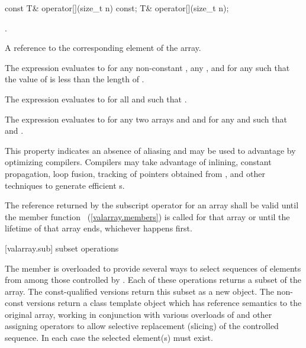 %
\begin{itemdecl}
const T&  operator[](size_t n) const;
T& operator[](size_t n);
\end{itemdecl}

\begin{itemdescr}
\pnum
\requires
{}.

\pnum
\returns
A reference to the corresponding element of the array.
\begin{note}
The expression 
evaluates to  for any non-constant ,
any , and for any 
such that the value of  is less than the length of .
\end{note}

\pnum
\remarks
The expression 
evaluates to  for all  and 
such that .

\pnum
The expression 
evaluates to  for any two arrays
 and  and for any
 and 
such that 
and .
\begin{note} This property indicates an absence of aliasing and may be used to
advantage by optimizing compilers. Compilers may take advantage
of inlining, constant propagation, loop fusion,
tracking of pointers obtained from
,
and other techniques to generate efficient
s.
\end{note}

\pnum
The reference returned by the subscript operator for an array shall
be valid until the member function
~(\ref{valarray.members}) is called for that array or until the lifetime of
that array ends, whichever happens first.
\end{itemdescr}

[valarray.sub]{ subset operations}

%
\pnum
The member  is overloaded to provide several ways to select
sequences of elements from among those controlled by . Each of these
operations returns a subset of the array. The const-qualified versions return this
subset as a new  object. The non-const versions return a class
template object which has reference semantics to the original array, working in
conjunction with various overloads of  and other assigning
operators to allow selective replacement (slicing) of the controlled sequence.
In each case the selected element(s) must exist.

